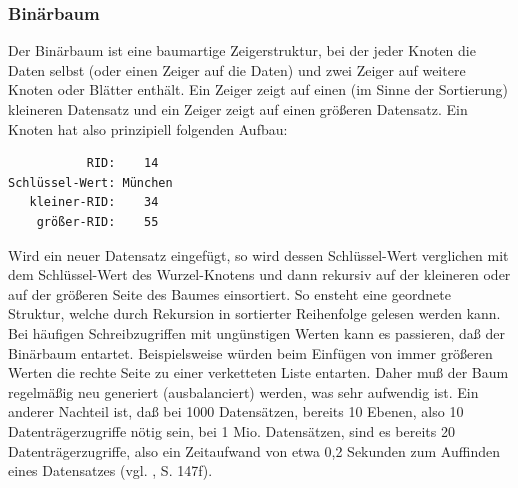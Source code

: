 \subsubsection{Binärbaum}
Der Binärbaum ist eine baumartige Zeigerstruktur, bei der jeder Knoten die Daten selbst (oder einen Zeiger auf die Daten) und zwei Zeiger auf weitere Knoten oder Blätter enthält. Ein Zeiger zeigt auf einen (im Sinne der Sortierung) kleineren Datensatz und ein Zeiger zeigt auf einen größeren Datensatz. Ein Knoten hat also prinzipiell folgenden Aufbau:
\begin{lstlisting}
           RID:    14
Schlüssel-Wert: München
   kleiner-RID:    34
    größer-RID:    55
\end{lstlisting}
Wird ein neuer Datensatz eingefügt, so wird dessen Schlüssel-Wert verglichen mit dem Schlüssel-Wert des Wurzel-Knotens und dann rekursiv auf der kleineren oder auf der größeren Seite des Baumes einsortiert. So ensteht eine geordnete Struktur, welche durch Rekursion in sortierter Reihenfolge gelesen werden kann. Bei häufigen Schreibzugriffen mit ungünstigen Werten kann es passieren, daß der Binärbaum entartet. Beispielsweise würden beim Einfügen von immer größeren Werten die rechte Seite zu einer verketteten Liste entarten. Daher muß der Baum regelmäßig neu generiert (ausbalanciert) werden, was sehr aufwendig ist. Ein anderer Nachteil ist, daß bei 1000 Datensätzen, bereits 10 Ebenen, also 10 Datenträgerzugriffe nötig sein, bei 1 Mio. Datensätzen, sind es bereits 20 Datenträgerzugriffe, also ein Zeitaufwand von etwa 0,2 Sekunden zum Auffinden eines Datensatzes (vgl. \cite{Sauer1998}, S. 147f).
